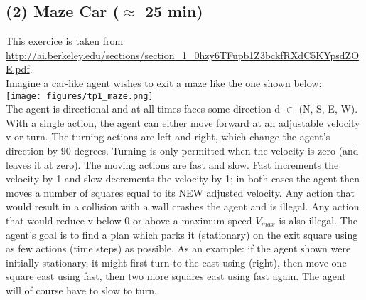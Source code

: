 \documentclass[9pt,a4paper]{extarticle}
\begin{document}
   \subsection*{(2) Maze Car ($\approx$ 25 min)}
This exercice is taken from \url{http://ai.berkeley.edu/sections/section_1_0hzy6TFupb1Z3bckfRXdC5KYpsdZOE.pdf}.\\
Imagine a car-like agent wishes to exit a maze like the one shown below:
\\
\texttt{[image: figures/tp1\_maze.png]}\\
The agent is directional and at all times faces some direction d $\in$ (N, S, E, W). With a single action, the agent
can either move forward at an adjustable velocity v or turn. The turning actions are left and right, which change
the agent’s direction by 90 degrees. Turning is only permitted when the velocity is zero (and leaves it at zero).
The moving actions are fast and slow. Fast increments the velocity by 1 and slow decrements the velocity by 1;
in both cases the agent then moves a number of squares equal to its NEW adjusted velocity. Any action that
would result in a collision with a wall crashes the agent and is illegal. Any action that would reduce v below 0
or above a maximum speed $V_{max}$ is also illegal. The agent’s goal is to find a plan which parks it (stationary)
on the exit square using as few actions (time steps) as possible.
As an example: if the agent shown were initially stationary, it might first turn to the east using (right), then
move one square east using fast, then two more squares east using fast again. The agent will of course have to
slow to turn.
\end{document}

